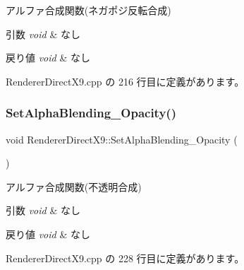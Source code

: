 アルファ合成関数(ネガポジ反転合成) 


\begin{DoxyParams}{引数}
{\em void} & なし \\
\hline
\end{DoxyParams}

\begin{DoxyRetVals}{戻り値}
{\em void} & なし \\
\hline
\end{DoxyRetVals}


 Renderer\+Direct\+X9.\+cpp の 216 行目に定義があります。

\mbox{\label{class_renderer_direct_x9_a789206ba211e9cbffe0bfe4c7dfb7457}} 
\subsubsection{\texorpdfstring{Set\+Alpha\+Blending\+\_\+\+Opacity()}{SetAlphaBlending\_Opacity()}}
{\footnotesize\ttfamily void Renderer\+Direct\+X9\+::\+Set\+Alpha\+Blending\+\_\+\+Opacity (\begin{DoxyParamCaption}{ }\end{DoxyParamCaption})}



アルファ合成関数(不透明合成) 


\begin{DoxyParams}{引数}
{\em void} & なし \\
\hline
\end{DoxyParams}

\begin{DoxyRetVals}{戻り値}
{\em void} & なし \\
\hline
\end{DoxyRetVals}


 Renderer\+Direct\+X9.\+cpp の 228 行目に定義があります。

\mbox{\label{class_renderer_direct_x9_a6ddbb9f801ef6b2c86ec5cd4e97b317b}} 
